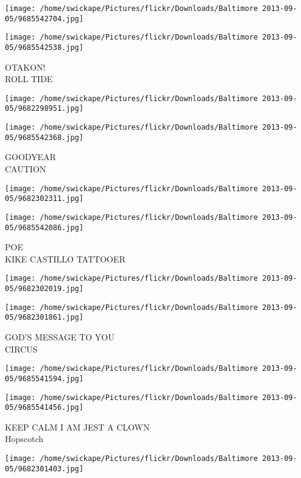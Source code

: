 \documentclass[10pt,letterpaper]{article}
\begin{document}
\texttt{[image: /home/swickape/Pictures/flickr/Downloads/Baltimore 2013-09-05/9685542704.jpg]}

\vspace{0.25in}
\texttt{[image: /home/swickape/Pictures/flickr/Downloads/Baltimore 2013-09-05/9685542538.jpg]}

OTAKON!\\
ROLL TIDE
\pagebreak

\texttt{[image: /home/swickape/Pictures/flickr/Downloads/Baltimore 2013-09-05/9682298951.jpg]}

\vspace{0.25in}
\texttt{[image: /home/swickape/Pictures/flickr/Downloads/Baltimore 2013-09-05/9685542368.jpg]}

GOODYEAR\\
CAUTION
\pagebreak

\texttt{[image: /home/swickape/Pictures/flickr/Downloads/Baltimore 2013-09-05/9682302311.jpg]}

\vspace{0.25in}
\texttt{[image: /home/swickape/Pictures/flickr/Downloads/Baltimore 2013-09-05/9685542086.jpg]}

POE\\
KIKE CASTILLO TATTOOER
\pagebreak

\texttt{[image: /home/swickape/Pictures/flickr/Downloads/Baltimore 2013-09-05/9682302019.jpg]}

\vspace{0.25in}
\texttt{[image: /home/swickape/Pictures/flickr/Downloads/Baltimore 2013-09-05/9682301861.jpg]}

GOD'S MESSAGE TO YOU\\
CIRCUS
\pagebreak

\texttt{[image: /home/swickape/Pictures/flickr/Downloads/Baltimore 2013-09-05/9685541594.jpg]}

\vspace{0.25in}
\texttt{[image: /home/swickape/Pictures/flickr/Downloads/Baltimore 2013-09-05/9685541456.jpg]}

KEEP CALM I AM JEST A CLOWN\\
Hopscotch
\pagebreak

\texttt{[image: /home/swickape/Pictures/flickr/Downloads/Baltimore 2013-09-05/9682301403.jpg]}
\end{document}
